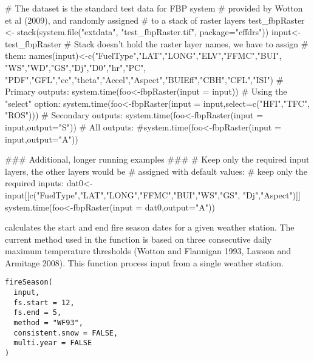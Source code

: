 \documentclass[a4paper]{book}
\begin{document}
%
\begin{SeeAlso}\relax
{}
\end{SeeAlso}
%
\begin{Examples}
\begin{ExampleCode}

# The dataset is the standard test data for FBP system
# provided by Wotton et al (2009), and randomly assigned
# to a stack of raster layers
test_fbpRaster <- stack(system.file("extdata", "test_fbpRaster.tif", package="cffdrs"))
input<-test_fbpRaster
# Stack doesn't hold the raster layer names, we have to assign
# them:
names(input)<-c("FuelType","LAT","LONG","ELV","FFMC","BUI", "WS","WD","GS","Dj","D0","hr","PC",
"PDF","GFL","cc","theta","Accel","Aspect","BUIEff","CBH","CFL","ISI")
# Primary outputs:
system.time(foo<-fbpRaster(input = input))
# Using the "select" option:
system.time(foo<-fbpRaster(input = input,select=c("HFI","TFC", "ROS")))
# Secondary outputs:
system.time(foo<-fbpRaster(input = input,output="S"))
# All outputs:
#system.time(foo<-fbpRaster(input = input,output="A"))

### Additional, longer running examples  ###
# Keep only the required input layers, the other layers would be
# assigned with default values:
# keep only the required inputs:
dat0<-input[[c("FuelType","LAT","LONG","FFMC","BUI","WS","GS", "Dj","Aspect")]]
system.time(foo<-fbpRaster(input = dat0,output="A"))

\end{ExampleCode}
\end{Examples}
%
\begin{Description}\relax
{} calculates the start and end fire season dates for
a given weather station. The current method used in the function is based on
three consecutive daily maximum temperature thresholds (Wotton and Flannigan
1993, Lawson and Armitage 2008). This function process input from a single
weather station.
\end{Description}
%
\begin{Usage}
\begin{verbatim}
fireSeason(
  input,
  fs.start = 12,
  fs.end = 5,
  method = "WF93",
  consistent.snow = FALSE,
  multi.year = FALSE
)
\end{verbatim}
\end{Usage}
%
\end{document}

